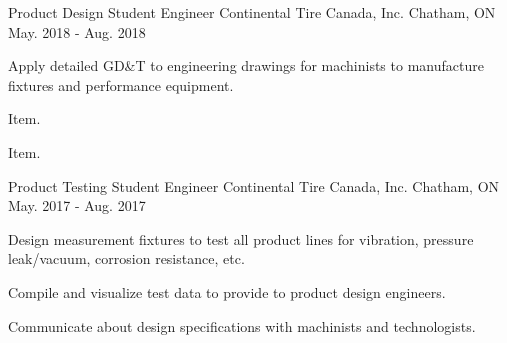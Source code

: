 \begin{cventries}

  \cventry
    {Product Design Student Engineer} %
    {Continental Tire Canada, Inc.} %
    {Chatham, ON} %
    {May. 2018 - Aug. 2018} %
    {
      \begin{cvitems} %
        \item{Apply detailed GD\&T to engineering drawings for machinists to manufacture fixtures and performance equipment.}
        \item{Item.}
        \item{Item.}
      \end{cvitems}
    }
    

  \cventry
    {Product Testing Student Engineer} %
    {Continental Tire Canada, Inc.} %
    {Chatham, ON} %
    {May. 2017 - Aug. 2017} %
    {
      \begin{cvitems} %
        \item {Design measurement fixtures to test all product lines for vibration, pressure leak/vacuum, corrosion resistance, etc.}
        \item {Compile and visualize test data to provide to product design engineers.}
        \item {Communicate about design specifications with machinists and technologists.}
      \end{cvitems}
    }
    
\end{cventries}
